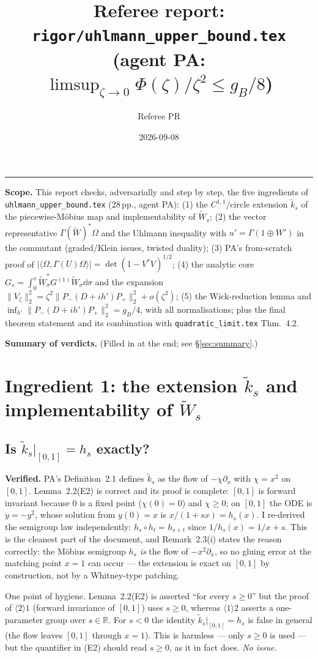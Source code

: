 \documentclass[11pt]{article}
\title{Referee report: \texttt{rigor/uhlmann\_upper\_bound.tex}\\
{\large (agent PA: $\limsup_{\zeta\to0}\Phi(\zeta)/\zeta^2\le g_B/8$)}}
\author{Referee PR}
\date{2026-09-08}
\newcommand{\Wt}{\widetilde W}
\newcommand{\kt}{\widetilde k}
\newcommand{\Pp}{P_+}\newcommand{\Pm}{P_-}
\begin{document}
\maketitle
\tableofcontents
\bigskip
\hrule
\bigskip
\textbf{Scope.} This report checks, adversarially and step by step, the five ingredients of
\texttt{uhlmann\_upper\_bound.tex} (28\,pp., agent PA):
(1) the $C^{1,1}$/circle extension $\kt_s$ of the piecewise-M\"obius map and implementability of $\Wt_s$;
(2) the vector representative $\Gamma(\Wt)^*\Omega$ and the Uhlmann inequality with $u'=\Gamma(1\oplus W')$ in the
commutant (graded/Klein issues, twisted duality);
(3) PA's from-scratch proof of $|\langle\Omega,\Gamma(U)\Omega\rangle|=\det(1-V^*V)^{1/2}$;
(4) the analytic core $G_s=\int_0^s \Wt_\sigma^*G^{(1)}\Wt_\sigma\dd\sigma$ and the expansion
$\lVert V_\zeta\rVert_2^2=\zeta^2\lVert \Pm(D+ih')\Pp\rVert_2^2+o(\zeta^2)$;
(5) the Wick-reduction lemma and $\inf_{h'}\lVert \Pm(D+ih')\Pp\rVert_2^2=g_B/4$, with all normalisations;
plus the final theorem statement and its combination with \texttt{quadratic\_limit.tex} Thm.~4.2.

\textbf{Summary of verdicts.} (Filled in at the end; see \S\ref{sec:summary}.)

\section{Ingredient 1: the extension $\kt_s$ and implementability of $\Wt_s$}\label{sec:i1}

\subsection{Is $\kt_s|_{[0,1]}=h_s$ exactly?}
\textbf{Verified.}  PA's Definition~2.1 defines $\kt_s$ as the flow of $-\chi\partial_x$ with
$\chi=x^2$ on $[0,1]$.  Lemma~2.2(E2) is correct and its proof is complete: $[0,1]$ is forward
invariant because $0$ is a fixed point ($\chi(0)=0$) and $\chi\ge0$; on $[0,1]$ the ODE is
$\dot y=-y^2$, whose solution from $y(0)=x$ is $x/(1+sx)=h_s(x)$.  I re-derived the semigroup law
independently: $h_s\circ h_t=h_{s+t}$ since $1/h_s(x)=1/x+s$.  This is the cleanest part of the
document, and Remark~2.3(i) states the reason correctly: the M\"obius semigroup $h_s$ \emph{is} the
flow of $-x^2\partial_x$, so no gluing error at the matching point $x=1$ can occur --- the extension
is exact on $[0,1]$ by construction, not by a Whitney-type patching.

One point of hygiene.  Lemma~2.2(E2) is asserted ``for every $s\ge0$'' but the proof of
$\langle2\rangle1$ (forward invariance of $[0,1]$) uses $s\ge0$, whereas $\langle1\rangle2$ asserts a
one-parameter group over $s\in\mathbb R$.  For $s<0$ the identity $\kt_s|_{[0,1]}=h_s$ is false in
general (the flow leaves $[0,1]$ through $x=1$).  This is harmless --- only $s\ge0$ is used --- but
the quantifier in (E2) should read $s\ge0$, as it in fact does.  \emph{No issue.}
\end{document}
